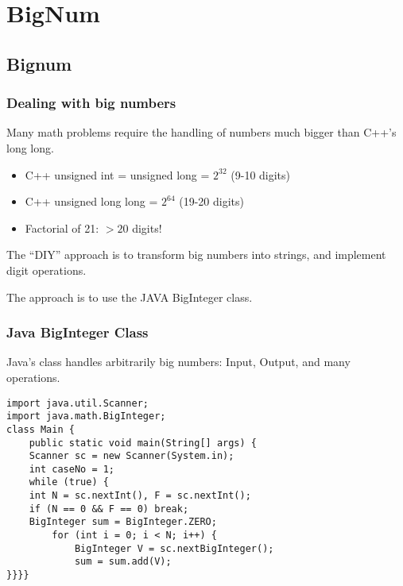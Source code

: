 \documentclass{beamer}
\begin{document}
\section{BigNum}
\subsection{Bignum}
\begin{frame}
  \frametitle{Dealing with big numbers}

  {\smaller
  \begin{block}{}
    Many math problems require the handling of numbers much bigger
    than C++'s long long.
  \end{block}

  \begin{itemize}
  \item C++ unsigned int = unsigned long = $2^{32}$ (9-10 digits)
  \item C++ unsigned long long = $2^{64}$ (19-20 digits)

    \medskip

  \item Factorial of 21: $> 20$ digits!
  \end{itemize}

  \begin{block}{}
    The ``DIY'' approach is to transform big numbers into strings, and
    implement digit operations.
    
    \bigskip

    The  approach is to use the JAVA
    BigInteger class.    
  \end{block}  
  }
\end{frame}

\begin{frame}
  \frametitle{Java BigInteger Class}

  {\smaller
  \begin{block}{}
    Java's  class handles arbitrarily big
    numbers: Input, Output, and many operations.
  \end{block}

  \begin{exampleblock}{}
\begin{verbatim}
import java.util.Scanner;
import java.math.BigInteger;
class Main {
    public static void main(String[] args) {
    Scanner sc = new Scanner(System.in);
    int caseNo = 1;
    while (true) {
    int N = sc.nextInt(), F = sc.nextInt();
    if (N == 0 && F == 0) break;
    BigInteger sum = BigInteger.ZERO; 
        for (int i = 0; i < N; i++) {
            BigInteger V = sc.nextBigInteger(); 
            sum = sum.add(V);
}}}}
\end{verbatim}
\end{exampleblock}}
\end{frame}
\end{document}
